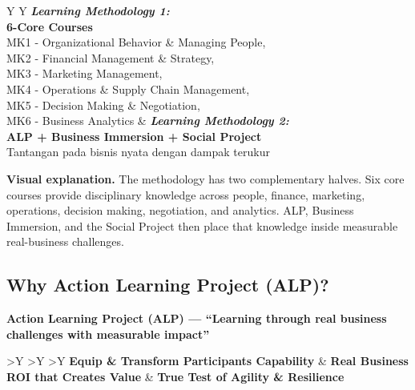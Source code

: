 \documentclass[10pt]{article}
\newcommand{\visualexplanation}[1]{%
  \begin{tcolorbox}[colback=lightgray,colframe=navy!35,boxrule=0.5pt,
    arc=2mm,left=2mm,right=2mm,top=1.5mm,bottom=1.5mm]
  \textbf{Visual explanation.} #1
  \end{tcolorbox}}
\begin{document}
\begin{tcolorbox}[colback=lightgray,colframe=lightgray,arc=4mm]
\begin{tabularx}{\linewidth}{Y Y}
\textbf{\emph{Learning Methodology 1:}}\\
\textbf{6-Core Courses}\\
MK1 - Organizational Behavior \& Managing People,\\
MK2 - Financial Management \& Strategy,\\
MK3 - Marketing Management,\\
MK4 - Operations \& Supply Chain Management,\\
MK5 - Decision Making \& Negotiation,\\
MK6 - Business Analytics
&
\textbf{\emph{Learning Methodology 2:}}\\
\textbf{ALP + Business Immersion + Social Project}\\[2mm]
Tantangan pada bisnis nyata dengan dampak terukur
\end{tabularx}
\end{tcolorbox}

\visualexplanation{The methodology has two complementary halves. Six core courses provide disciplinary knowledge across people, finance, marketing, operations, decision making, negotiation, and analytics. ALP, Business Immersion, and the Social Project then place that knowledge inside measurable real-business challenges.}

\subsection{Why Action Learning Project (ALP)?}

\begin{tcolorbox}[colback=lightgray,colframe=lightgray,arc=4mm]
\centering
\textbf{\color{navy}Action Learning Project (ALP) --- ``Learning through real business challenges with measurable impact''}\\[2mm]
\begin{tabularx}{\linewidth}{>{\centering\arraybackslash}Y >{\centering\arraybackslash}Y >{\centering\arraybackslash}Y}
\Large\textbf{Equip \& Transform Participants Capability} &
\Large\textbf{Real Business ROI that Creates Value} &
\Large\textbf{True Test of Agility \& Resilience}
\end{tabularx}
\end{tcolorbox}
\end{document}
